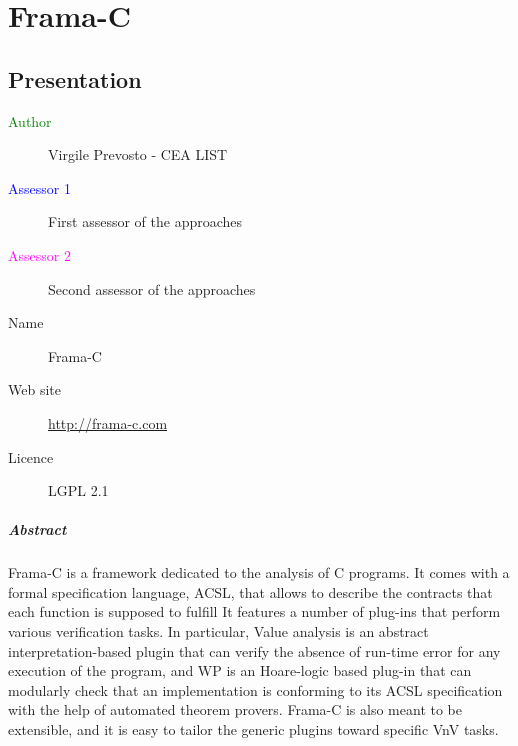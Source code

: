 \chapter{Frama-C}
\label{sec:framaC}

\section{Presentation}
\begin{description}
\item[\textcolor{green}{Author}] Virgile Prevosto - CEA LIST
\item[\textcolor{blue}{Assessor 1}] First assessor of the approaches 
\item[\textcolor{magenta}{Assessor 2}] Second assessor of the approaches 
\end{description}

\begin{description}
\item[Name] Frama-C
\item[Web site] \url{http://frama-c.com}
\item[Licence] LGPL 2.1
\end{description}

\paragraph{Abstract}
Frama-C is a framework dedicated to the analysis of C programs. It comes
with a formal specification language, ACSL, that allows to describe the
contracts that each function is supposed to fulfill It features a
number of plug-ins that perform various verification tasks. In particular,
Value analysis is an abstract interpretation-based plugin that can verify the
absence of run-time error for any execution of the program, and WP is an 
Hoare-logic based plug-in that can modularly check that an implementation
is conforming to its ACSL specification with the help of automated theorem
provers. Frama-C is also meant to be extensible, and it is easy to tailor
the generic plugins toward specific VnV tasks.

